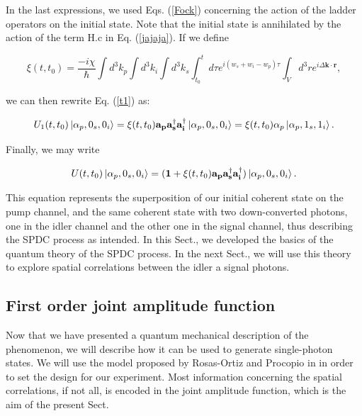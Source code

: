 \documentclass[12pt]{book}
\begin{document}
In the last expressions, we used Eqs. (\ref{Fock})  concerning the action of the ladder operators on the initial state. Note that the initial state is annihilated by the action of the term $\mathrm{H.c}$ in Eq. (\ref{jajaja}).  If we define 

\begin{equation}
 \xi(t,t_{0})=\frac{-i\chi}{\hbar}  \int d^{3}k_{p}\int d^{3}k_{i} \int d^{3}k_{s}    \int_{t_{0}}^{t} d\tau e^{i(w_{s}+w_{i}-w_{p})\tau}  
\int_{V} d^{3}r  e^{i \Delta\textbf{k} \cdot\textbf{r}} ,
\end{equation}



we can then rewrite Eq. (\ref{t1}) as:

\begin{equation}
U_{1}(t,t_{0})\ket{\alpha_{p},0_{s},0_{i}}=\xi(t,t_{0}) \mathbf{a_{p}}\mathbf{a_{s}^{\dagger}}\mathbf{a_{i}^{\dagger}}\ket{\alpha_{p},0_{s},0_{i}}=\xi(t,t_{0}) \alpha_{p} \ket{\alpha_{p},1_{s},1_{i}}.
\end{equation}

Finally, we may write

\begin{equation}
    U(t,t_{0})\ket{\alpha_{p},0_{s},0_{i}}=(\mathbf{1}+\xi(t,t_{0}) \mathbf{a_{p}}\mathbf{a_{s}^{\dagger}}\mathbf{a_{i}^{\dagger}})\ket{\alpha_{p},0_{s},0_{i}}. \label{evo}
\end{equation}

This equation represents the superposition of our initial coherent state on the pump channel, and the same coherent state with two down-converted photons, one in the idler channel and the other one in the signal channel, thus describing the SPDC process as intended. In this Sect., we developed the basics of the quantum theory of the SPDC process. In the next Sect., we will use this theory to explore spatial correlations between the idler a signal photons.

\subsection{First order joint amplitude function}

Now that we have presented a quantum mechanical description of the phenomenon, we will describe how it can be used to generate single-photon states. We will use the model proposed by  Rosas-Ortiz and  Procopio in \cite{procopio} in order to set the design for our experiment. Most information concerning the spatial correlations, if not all, is encoded in the joint amplitude function, which is the aim of the present Sect.
\end{document}
